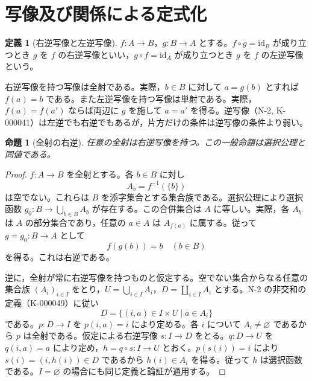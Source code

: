 \documentclass[a5paper,10pt,dvipdfmx]{jsarticle}
\theoremstyle{definition}
\newtheorem{defn}[ruledef]{定義}
\theoremstyle{plain}
\newtheorem{prop}[ruledef]{命題}
\newcommand{\id}{\mathrm{id}}
\begin{document}
\section{写像及び関係による定式化}
\begin{defn}[右逆写像と左逆写像]\label{k62}
$f:A\to B$，$g:B\to A$ とする。$f\circ g=\id_B$ が成り立つとき $g$ を $f$ の右逆写像といい，$g\circ f=\id_A$ が成り立つとき $g$ を $f$ の左逆写像という。
\end{defn}
右逆写像を持つ写像は全射である。実際，$b\in B$ に対して $a=g(b)$ とすれば $f(a)=b$ である。また左逆写像を持つ写像は単射である。実際，$f(a)=f(a')$ ならば両辺に $g$ を施して $a=a'$ を得る。逆写像（N-2, K-000041）は左逆でも右逆でもあるが，片方だけの条件は逆写像の条件より弱い。
\begin{prop}[全射の右逆]\label{k63}
任意の全射は右逆写像を持つ。この一般命題は選択公理と同値である。
\end{prop}
\begin{proof}
$f:A\to B$ を全射とする。各 $b\in B$ に対し
\[
 A_b=f^{-1}(\{b\})
\]
は空でない。これらは $B$ を添字集合とする集合族である。選択公理により選択函数 $g_0:B\to\bigcup_{b\in B}A_b$ が存在する。この合併集合は $A$ に等しい。実際，各 $A_b$ は $A$ の部分集合であり，任意の $a\in A$ は $A_{f(a)}$ に属する。従って $g=g_0:B\to A$ として
\[
 f(g(b))=b\quad(b\in B)
\]
を得る。これは右逆である。

逆に，全射が常に右逆写像を持つものと仮定する。空でない集合からなる任意の集合族 $(A_i)_{i\in I}$ をとり，$U=\bigcup_{i\in I}A_i$，$D=\coprod_{i\in I}A_i$ とする。N-2 の非交和の定義（K-000049）に従い
\[
 D=\{(i,a)\in I\times U\mid a\in A_i\}
\]
である。$p:D\to I$ を $p(i,a)=i$ により定める。各 $i$ について $A_i\ne\varnothing$ であるから $p$ は全射である。仮定による右逆写像 $s:I\to D$ をとる。$q:D\to U$ を $q(i,a)=a$ により定め，$h=q\circ s:I\to U$ とおく。$p(s(i))=i$ により $s(i)=(i,h(i))\in D$ であるから $h(i)\in A_i$ を得る。従って $h$ は選択函数である。$I=\varnothing$ の場合にも同じ定義と論証が通用する。
\end{proof}
\end{document}
